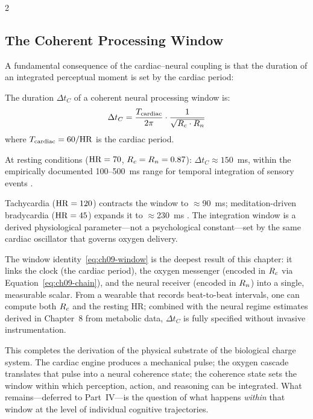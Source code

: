 \begin{multicols}{2}

\subsection{The Coherent Processing Window}

A fundamental consequence of the cardiac--neural coupling is that the
duration of an integrated perceptual moment is set by the cardiac period:

\begin{theorem}
\label{thm:ch09-window}
The duration $\Delta t_C$ of a coherent neural processing window is:
\begin{equation}
\Delta t_C = \frac{T_{\mathrm{cardiac}}}{2\pi}\cdot\frac{1}{\sqrt{R_c\cdot R_n}}
\label{eq:ch09-window}
\end{equation}
where $T_{\mathrm{cardiac}} = 60/\mathrm{HR}$ is the cardiac period.
\end{theorem}

At resting conditions ($\mathrm{HR} = 70$, $R_c = R_n = 0.87$):
$\Delta t_C \approx 150$~ms, within the empirically documented
100--500~ms range for temporal integration of sensory events
\citep{libet1983time,sergent2005timing}.

Tachycardia ($\mathrm{HR} = 120$) contracts the window to $\approx$90~ms;
meditation-driven bradycardia ($\mathrm{HR} = 45$) expands it to
$\approx$230~ms \citep{phongsuphap2008heart,tang2015neuroscience}.
The integration window is a derived physiological parameter---not a
psychological constant---set by the same cardiac oscillator that
governs oxygen delivery.

\columnbreak

The window identity~\eqref{eq:ch09-window} is the deepest result
of this chapter: it links the clock (the cardiac period), the oxygen
messenger (encoded in $R_c$ via Equation~\eqref{eq:ch09-chain}), and
the neural receiver (encoded in $R_n$) into a single, measurable
scalar. From a wearable that records beat-to-beat intervals, one can
compute both $R_c$ and the resting HR; combined with the neural regime
estimates derived in Chapter~8 from metabolic data, $\Delta t_C$ is
fully specified without invasive instrumentation.

This completes the derivation of the physical substrate of the
biological charge system. The cardiac engine produces a mechanical
pulse; the oxygen cascade translates that pulse into a neural coherence
state; the coherence state sets the window within which perception,
action, and reasoning can be integrated. What remains---deferred to
Part~IV---is the question of what happens \emph{within} that window
at the level of individual cognitive trajectories.

\end{multicols}

